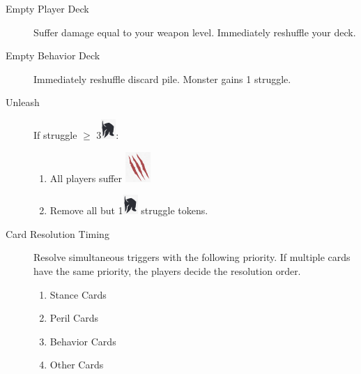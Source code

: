 \documentclass[12pt]{article}
\newenvironment{enumerateCustom}
{\begin{enumerate}
  \setlength{\itemsep}{1pt}
  \setlength{\parskip}{0pt}
  \setlength{\parsep}{0pt}}
{\end{enumerate}}
\begin{document}
\pagebreak

\begin{mdframed}[style=SummaryCard, align=center, userdefinedwidth=35em, frametitle={Important Triggers and Resolutions}]


    \begin{description}
        \item[Empty Player Deck] Suffer damage equal to your weapon level. Immediately reshuffle your deck.
        \item[Empty Behavior Deck] Immediately reshuffle discard pile. Monster gains 1 struggle.
        \item[Unleash] If struggle $\ge$ 3\includegraphics[scale=0.40]{images/per_player.png}:
            \begin{enumerateCustom}
                \item All players suffer \includegraphics[scale=0.30]{images/monster_damage.png}
                \item Remove all but 1\includegraphics[scale=0.40]{images/per_player.png} struggle tokens.
            \end{enumerateCustom}
        \item[Card Resolution Timing] Resolve simultaneous triggers with the following priority. If multiple cards have the same priority, the players decide the resolution order.
            \begin{enumerateCustom}
                \item Stance Cards
                \item Peril Cards
                \item Behavior Cards
                \item Other Cards
            \end{enumerateCustom}
    \end{description}

\end{mdframed}
\end{document}
